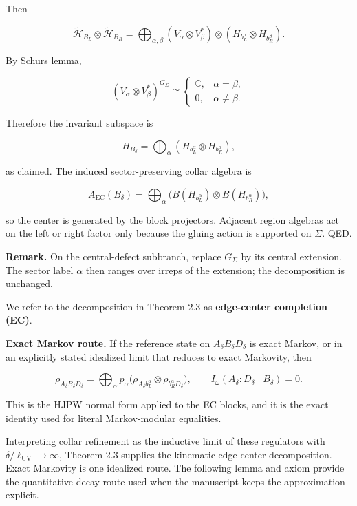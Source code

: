 Then

\[
\tilde{\mathcal H}_{B_L} \otimes \tilde{\mathcal H}_{B_R}
= \bigoplus_{\alpha,\beta}
(V_\alpha \otimes V_\beta^*) \otimes
(H_{b_L^\alpha} \otimes H_{b_R^\beta}).
\]

By Schur\textquotesingle s lemma,

\[
(V_\alpha \otimes V_\beta^*)^{G_\Sigma}
\cong
\begin{cases}
\mathbb C, & \alpha=\beta,\\
0, & \alpha\ne\beta.
\end{cases}
\]

Therefore the invariant subspace is

\[
H_{B_\delta} = \bigoplus_\alpha (H_{b_L^\alpha} \otimes H_{b_R^\alpha}),
\]

as claimed. The induced sector-preserving collar algebra is

\[
A_{\mathrm{EC}}(B_\delta) = \bigoplus_\alpha
\bigl(B(H_{b_L^\alpha}) \otimes B(H_{b_R^\alpha})\bigr),
\]

so the center is generated by the block projectors. Adjacent region algebras act on the left or right factor only because the gluing action is supported on \(\Sigma\). QED.

\textbf{Remark.} On the central-defect subbranch, replace \(G_\Sigma\) by its central extension. The sector label \(\alpha\) then ranges over irreps of the extension; the decomposition is unchanged.

We refer to the decomposition in Theorem 2.3 as \textbf{edge-center completion (EC)}.

\textbf{Exact Markov route.} If the reference state on \(A_\delta B_\delta D_\delta\) is exact Markov, or in an explicitly stated idealized limit that reduces to exact Markovity, then

\[
\rho_{A_\delta B_\delta D_\delta}
= \bigoplus_\alpha p_\alpha
\bigl(\rho_{A_\delta b_L^\alpha} \otimes \rho_{b_R^\alpha D_\delta}\bigr),
\qquad
I_\omega(A_\delta:D_\delta \mid B_\delta)=0.
\]

This is the HJPW normal form applied to the EC blocks, and it is the exact identity used for
literal Markov-modular equalities.

Interpreting collar refinement as the inductive limit of these regulators with \(\delta/\ell_{\mathrm{UV}} \to \infty\), Theorem 2.3 supplies the kinematic edge-center decomposition. Exact Markovity is one idealized route. The following lemma and axiom provide the quantitative decay route used when the manuscript keeps the approximation explicit.

